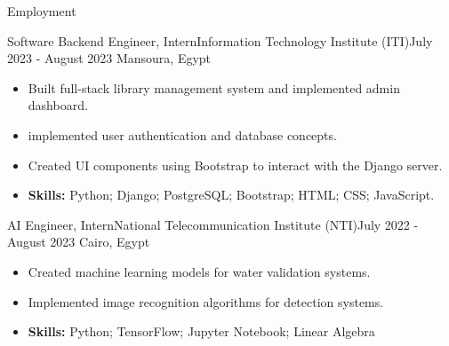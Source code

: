 \documentclass[]{cv}
\begin{document}
	\makeheader 



		

	\begin{cvsection}{Employment}
				\vspace{3mm}


				\begin{cvsubsection}{Software Backend Engineer, Intern}{Information Technology Institute (ITI)}{July 2023 - August 2023 \linebreak Mansoura, Egypt}
			\vspace{3mm}

			\begin{itemize}
				\item Built full-stack library management system and implemented admin dashboard.
				\item implemented user authentication and database concepts.
				\item Created UI components using Bootstrap to interact with the Django server.
				\item \textbf{Skills:} Python; Django; PostgreSQL; Bootstrap; HTML; CSS; JavaScript.
			\end{itemize}
		\end{cvsubsection}		
		\begin{cvsubsection}{AI Engineer, Intern}{National Telecommunication Institute (NTI)}{July 2022 - August 2023 \linebreak Cairo, Egypt}
			\vspace{3mm}

			\begin{itemize}
				\item Created machine learning models for water validation systems.
				\item Implemented image recognition algorithms for detection systems.
				\item \textbf{Skills:} Python; TensorFlow; Jupyter Notebook; Linear Algebra 
			\end{itemize}
		\end{cvsubsection}
		

		
	
		
	\end{cvsection}
	
\end{document}
